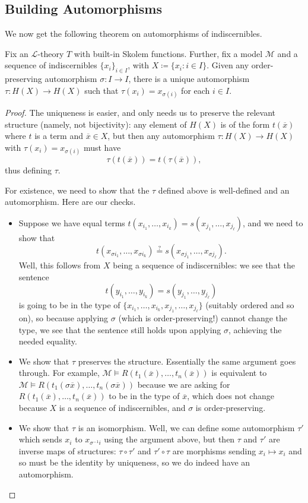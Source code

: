 \documentclass[../notes.tex]{subfiles}
\begin{document}
\subsection{Building Automorphisms}
We now get the following theorem on automorphisms of indiscernibles.
\begin{theorem} \label{thm:get-autos}
	Fix an $\mathcal L$-theory $T$ with built-in Skolem functions. Further, fix a model $\mathcal M$ and a sequence of indiscernibles $\{x_i\}_{i\in I}$, with $X\coloneqq\{x_i:i\in I\}$. Given any order-preserving automorphism $\sigma\colon I\to I$, there is a unique automorphism $\tau\colon H(X)\to H(X)$ such that $\tau(x_i)=x_{\sigma(i)}$ for each $i\in I$.
\end{theorem}
\begin{proof}
	The uniqueness is easier, and only needs us to preserve the relevant structure (namely, not bijectivity): any element of $H(X)$ is of the form $t(\overline x)$ where $t$ is a term and $\overline x\in X$, but then any automorphism $\tau\colon H(X)\to H(X)$ with $\tau(x_i)=x_{\sigma(i)}$ must have
	\[\tau(t(\overline x))=t(\tau(\overline x)),\]
	thus defining $\tau$.

	For existence, we need to show that the $\tau$ defined above is well-defined and an automorphism. Here are our checks.
	\begin{itemize}
		\item Suppose we have equal terms $t(x_{i_1},\ldots,x_{i_k})=s(x_{j_1},\ldots,x_{j_\ell})$, and we need to show that
		\[t(x_{\sigma i_1},\ldots,x_{\sigma i_k})\stackrel?=s(x_{\sigma j_1},\ldots,x_{\sigma j_\ell}).\]
		Well, this follows from $X$ being a sequence of indiscernibles: we see that the sentence
		\[t(y_{i_1},\ldots,y_{i_k})=s(y_{j_1},\ldots,y_{j_\ell})\]
		is going to be in the type of $\{x_{i_1},\ldots,x_{i_k},x_{j_1},\ldots,x_{j_\ell}\}$ (suitably ordered and so on), so because applying $\sigma$ (which is order-preserving!) cannot change the type, we see that the sentence still holds upon applying $\sigma$, achieving the needed equality.
		\item We show that $\tau$ preserves the structure. Essentially the same argument goes through. For example, $\mathcal M\models R(t_1(\overline x),\ldots,t_n(\overline x))$ is equivalent to $\mathcal M\models R(t_1(\sigma\overline x),\ldots,t_n(\sigma\overline x))$ because we are asking for $R(t_1(\overline x),\ldots,t_n(\overline x))$ to be in the type of $\overline x$, which does not change because $X$ is a sequence of indiscernibles, and $\sigma$ is order-preserving.
		\item We show that $\tau$ is an isomorphism. Well, we can define some automorphism $\tau'$ which sends $x_i$ to $x_{\sigma^{-1}i}$ using the argument above, but then $\tau$ and $\tau'$ are inverse maps of structures: $\tau\circ\tau'$ and $\tau'\circ\tau$ are morphisms sending $x_i\mapsto x_i$ and so must be the identity by uniqueness, so we do indeed have an automorphism.
		\qedhere
	\end{itemize}
\end{proof}
\end{document}
